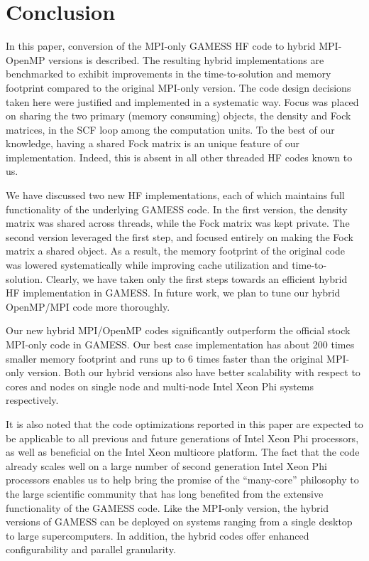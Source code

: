 \section{Conclusion}
\label{sec:conclusion}

In this paper, conversion of the MPI-only GAMESS HF code to hybrid MPI-OpenMP versions is described. The resulting hybrid implementations are benchmarked to exhibit improvements in the time-to-solution and memory footprint compared to the original MPI-only version. The code design decisions taken here were justified and implemented in a systematic way. Focus was placed on sharing the two primary (memory consuming) objects, the density and Fock matrices, in the SCF loop among the computation units. To the best of our knowledge, having a shared Fock matrix is an unique feature of our implementation. Indeed, this is absent in all other threaded HF codes known to us.

We have discussed two new HF implementations, each of which maintains full functionality of the underlying GAMESS code. In the first version, the density matrix was shared across threads, while the Fock matrix was kept private. The second version leveraged the first step, and focused entirely on making the Fock matrix a shared object. As a result, the memory footprint of the original code was lowered systematically while improving cache utilization and time-to-solution. Clearly, we have taken only the first steps towards an efficient hybrid HF implementation in GAMESS. In future work, we plan to tune our hybrid OpenMP/MPI code more thoroughly.

Our new hybrid MPI/OpenMP codes significantly outperform the official stock MPI-only code in GAMESS. Our best case implementation has about 200 times smaller memory footprint and runs up to 6 times faster than the original MPI-only version. Both our hybrid versions also have better scalability with respect to cores and nodes on single node and multi-node Intel Xeon Phi systems respectively.

It is also noted that the code optimizations reported in this paper are expected to be applicable to all previous and future generations of Intel Xeon Phi processors, as well as beneficial on the Intel Xeon multicore platform. The fact that the code already scales well on a large number of second generation Intel Xeon Phi processors enables us to help bring the promise of the ``many-core'' philosophy to the large scientific community that has long benefited from the extensive functionality of the GAMESS code. Like the MPI-only version, the hybrid versions of GAMESS can be deployed on systems ranging from a single desktop to large supercomputers. In addition, the hybrid codes offer enhanced configurability and parallel granularity.

